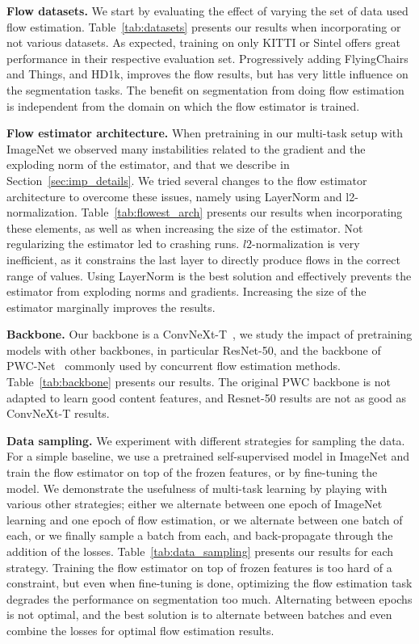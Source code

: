 \documentclass{article} %
\newcommand{\parspace}{\vspace{0mm}}
\begin{document}
\noindent\textbf{Flow datasets.} We start by evaluating the effect of varying the set of data used flow estimation. Table~\ref{tab:datasets} presents our results when incorporating or not various datasets. As expected, training on only KITTI or Sintel offers great performance in their respective evaluation set. Progressively adding FlyingChairs and Things, and HD1k, improves the flow results, but has very little influence on the segmentation tasks. The benefit on segmentation from doing flow estimation is independent from the domain on which the flow estimator is trained.
\parspace

\noindent\textbf{Flow estimator architecture.} When pretraining in our multi-task setup with ImageNet we observed many instabilities related to the gradient and the exploding norm of the estimator, and that we describe in Section~\ref{sec:imp_details}. We tried several changes to the flow estimator architecture to overcome these issues, namely using LayerNorm and l2-normalization. Table~\ref{tab:flowest_arch} presents our results when incorporating these elements, as well as when increasing the size of the estimator. Not regularizing the estimator led to crashing runs. $l2$-normalization is very inefficient, as it constrains the last layer to directly produce flows in the correct range of values. Using LayerNorm is the best solution and effectively prevents the estimator from exploding norms and gradients. Increasing the size of the estimator marginally improves the results.
\parspace

\noindent\textbf{Backbone.} Our backbone is a ConvNeXt-T~\citep{liu2022convnext}, we study the impact of pretraining models with other backbones, in particular ResNet-50, and the backbone of PWC-Net~\citep{sun2018pwcnet} commonly used by concurrent flow estimation methods. Table~\ref{tab:backbone} presents our results. The original PWC backbone is not adapted to learn good content features, and Resnet-50 results are not as good as ConvNeXt-T results.
\parspace

\noindent\textbf{Data sampling.} We experiment with different strategies for sampling the data. For a simple baseline, we use a pretrained self-supervised model in ImageNet and train the flow estimator on top of the frozen features, or by fine-tuning the model. We demonstrate the usefulness of multi-task learning by playing with various other strategies; either we alternate between one epoch of ImageNet learning and one epoch of flow estimation, or we alternate between one batch of each, or we finally sample a batch from each, and back-propagate through the addition of the losses. Table~\ref{tab:data_sampling} presents our results for each strategy. Training the flow estimator on top of frozen features is too hard of a constraint, but even when fine-tuning is done, optimizing the flow estimation task degrades the performance on segmentation too much. Alternating between epochs is not optimal, and the best solution is to alternate between batches and even combine the losses for optimal flow estimation results.
\parspace
\end{document}
